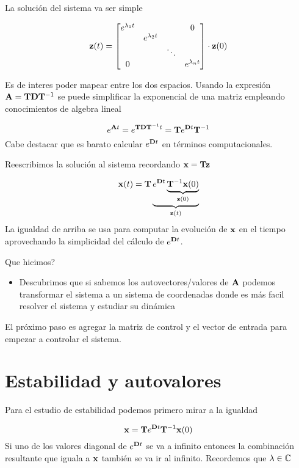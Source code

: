 \documentclass[11pt, a4paper, twoside, openright, openany]{book}
\newcommand{\dimss}{\dimfont{n}}
\begin{document}
La solución del sistema va ser simple

\[
\Cme{z}(t) = \begin{bmatrix}
e^{\lambda_1 t} & & & 0 \\
 &e^{\lambda_2 t}& &  \\
 & &\ddots &  \\
  0& & & e^{\lambda_\dimss t} \\
\end{bmatrix} \cdot \Cme{z}(0)
\]

Es de interes poder mapear entre los dos espacios. Usando la expresión \( \mathbf{A} = \mathbf{T} \mathbf{D} \mathbf{T}^{-1}\) se puede simplificar la exponencial de una matriz empleando conocimientos de algebra lineal

\[
e^{\mathbf{A}t} = e^{\mathbf{T} \mathbf{D} \mathbf{T}^{-1}t} = \mathbf{T} e^{\mathbf{D}t} \mathbf{T}^{-1}
\]
Cabe destacar que es barato calcular \( e^{\mathbf{D}t}\) en términos computacionales. 

Reescribimos la solución al sistema recordando \(\mathbf{x} = \mathbf{T}\mathbf{z}\)

\[
\mathbf{x}(t) = \mathbf{T}  \underbrace{e^{\mathbf{D}t} \underbrace{\mathbf{T}^{-1} \mathbf{x}(0)}_{\mathbf{z}(0)}}_{\mathbf{z}(t)}
\]
La igualdad de arriba se usa para computar la evolución de $\mathbf{x}$ en el tiempo aprovechando la simplicidad del cálculo de \(e^{\mathbf{D}t}\). 

Que hicimos?
\begin{itemize}
	\item Descubrimos que si sabemos los autovectores/valores de \(\mathbf{A}\) podemos transformar el sistema a un sistema de coordenadas donde es más facil resolver el sistema y estudiar su dinámica
\end{itemize}
 
El próximo paso es agregar la matriz de control y el vector de entrada para empezar a controlar el sistema.

\chapter{Estabilidad y autovalores} \label{chap:estabilidadAutovalores}


Para el estudio de estabilidad podemos primero mirar a la igualdad

 \[
\mathbf{x} = \mathbf{T} e^{\mathbf{D}t} \mathbf{T}^{-1} \mathbf{x}(0)
\]
Si uno de los valores diagonal de $e^{\mathbf{D}t}$ se va a infinito entonces la combinación resultante que iguala a \(\mathbf{x}\) también se va ir al infinito. Recordemos que $\lambda \in \Bbb{C}$
\end{document}
